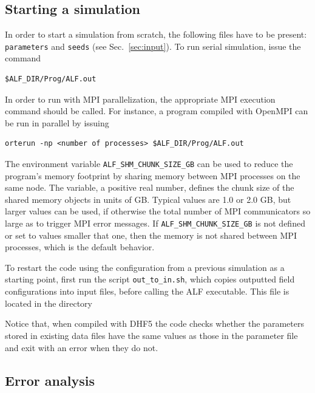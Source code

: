 \subsection*{Starting a simulation}
%

In order to start a simulation from scratch, the following files have to be present: \texttt{parameters} and \texttt{seeds} (see Sec.~\ref{sec:input}). 
To run serial simulation, issue the command
\begin{lstlisting}[style=bash]
$ALF_DIR/Prog/ALF.out
\end{lstlisting}
In order to run with MPI parallelization, the appropriate MPI execution command should be called. For instance, a program compiled with OpenMPI can be run in parallel by issuing  
\begin{lstlisting}[style=bash]
orterun -np <number of processes> $ALF_DIR/Prog/ALF.out
\end{lstlisting}

\noindent The environment variable \texttt{ALF\_SHM\_CHUNK\_SIZE\_GB} can be used to reduce the program's memory footprint by sharing memory between MPI processes on the same node. The variable, a positive real number, defines the chunk size of the shared memory objects in units of GB.
Typical values are 1.0 or 2.0 GB, but larger values can be used, if otherwise the total number of MPI communicators so large as to trigger MPI error messages.
If \texttt{ALF\_SHM\_CHUNK\_SIZE\_GB} is not defined or set to values smaller that one, then the memory is not shared between MPI processes, which is the default behavior.

To restart the code using the configuration from a previous simulation as a starting point, first run the script \texttt{out\_to\_in.sh}, which copies outputted field configurations into input files, before calling the ALF executable.   This file is located in the  directory 

Notice that, when compiled with DHF5 the code checks whether the parameters stored in existing data files have the same values as those in the parameter file and exit with an error when they do not.

%
\subsection{Error analysis}\label{sec:analysis}
%

